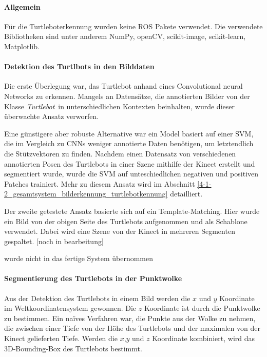 \paragraph{Allgemein}
Für die Turtleboterkennung wurden keine ROS Pakete verwendet. Die verwendete Bibliotheken sind unter anderem NumPy, openCV, scikit-image, scikit-learn, Matplotlib.

\paragraph{Detektion des Turtlbots in den Bilddaten}
Die erste Überlegung war, das Turtlebot anhand eines Convolutional neural Networks zu erkennen. Mangels an Datensätze, die annotierten Bilder von der Klasse \textit{Turtlebot}\ in unterschiedlichen Kontexten beinhalten, wurde dieser überwachte Ansatz verworfen.

Eine günstigere aber robuste Alternative war ein Model basiert auf einer SVM, die im Vergleich zu CNNs weniger annotierte Daten benötigen, um letztendlich die Stützvektoren zu finden. Nachdem einen Datensatz von verschiedenen annotierten Posen des Turtlebots in einer Szene mithilfe der Kinect erstellt und segmentiert wurde, wurde die SVM auf unteschiedlichen negativen und positiven Patches trainiert. Mehr zu diesem Ansatz wird im Abschnitt
\ref{4-1-2_gesamtsystem_bilderkennung_turtlebotkennung} detailliert.

Der zweite getestete Ansatz basierte sich auf ein Template-Matching. Hier wurde ein Bild von der obigen Seite des Turtlebots aufgenommen und als Schablone verwendet. Dabei wird eine Szene von der Kinect in mehreren Segmenten gespaltet. [noch in bearbeitung]

wurde nicht in das fertige System übernommen

\paragraph{Segmentierung des Turtlebots in der Punktwolke}
Aus der Detektion des Turtlebots in einem Bild werden die \(x\) und \(y\) Koordinate im Weltkoordinatensystem gewonnen. Die \(z\) Koordinate ist durch die Punktwolke zu bestimmen. Ein naïves Verfahren war, die Punkte aus der Wolke zu nehmen, die zwischen einer Tiefe von der Höhe des Turtlebots und der maximalen von der Kinect gelieferten Tiefe.
Werden die \(x\),\(y\) und \(z\) Koordinate kombiniert, wird das 3D-Bounding-Box des Turtlebots bestimmt.